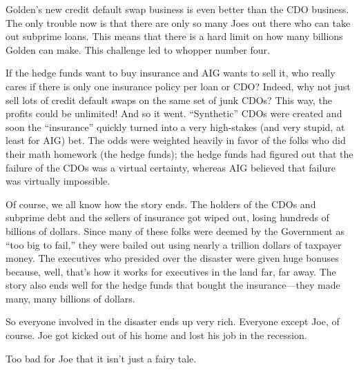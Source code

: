 Golden's new credit default swap business is even better than the CDO
business.  The only trouble now is that there are only so many Joes
out there who can take out subprime loans.  This means that there is a
hard limit on how many billions Golden can make.  This challenge led
to whopper number four.

If the hedge funds want to buy insurance and AIG wants to sell it, who
really cares if there is only one insurance policy per loan or CDO\@?
Indeed, why not just sell lots of credit default swaps on the same set
of junk CDOs?  This way, the profits could be unlimited!  And so it
went.  ``Synthetic'' CDOs were created and soon the ``insurance''
quickly turned into a very high-stakes (and very stupid, at least for
AIG) bet.  The odds were weighted heavily in favor of the folks who
did their math homework (the hedge funds); the hedge funds had figured
out that the failure of the CDOs was a virtual certainty, whereas AIG
believed that failure was virtually impossible.

Of course, we all know how the story ends.  The holders of the CDOs
and subprime debt and the sellers of insurance got wiped out, losing
hundreds of billions of dollars.  Since many of these folks were
deemed by the Government as ``too big to fail,'' they were bailed out
using nearly a trillion dollars of taxpayer money.  The executives who
presided over the disaster were given huge bonuses because, well,
that's how it works for executives in the land far, far away.  The
story also ends well for the hedge funds that bought the
insurance---they made many, many billions of dollars.

So everyone involved in the disaster ends up very rich.  Everyone
except Joe, of course.  Joe got kicked out of his home and lost his
job in the recession.

Too bad for Joe that it isn't just a fairy tale.

\problemsection

\endinput
